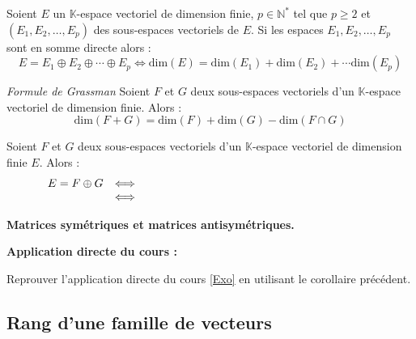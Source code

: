 \documentclass[french,11pt,twoside]{VcCours}
\newenvironment{ApplicationDirecte}{\textbf{Application directe du cours :}

}{}
\begin{document}
\begin{Corollaire}{} Soient $E$ un $\mathbb{K}$-espace vectoriel de dimension finie, $p \in \mathbb{N}^*$ tel que $p \geq 2$ et $(E_1, E_2, \ldots, E_p)$ des sous-espaces vectoriels de $E$. Si les espaces $E_1, E_2, \ldots, E_p$ sont en somme directe alors :
$$ E = E_1 \oplus E_2 \oplus \cdots \oplus E_p \Longleftrightarrow  \textrm{dim}(E) = \textrm{dim}(E_1) + \textrm{dim}(E_2) + \cdots \textrm{dim}(E_p)$$
\end{Corollaire}


\begin{Proposition}{\emph{Formule de Grassman}} Soient $F$ et $G$ deux sous-espaces vectoriels d'un $\mathbb{K}$-espace vectoriel de dimension finie. Alors :
$$ \textrm{dim}(F+G) = \textrm{dim}(F) + \textrm{dim}(G) - \textrm{dim}( F \cap G)$$
\end{Proposition}

\begin{Corollaire}{} Soient $F$ et $G$ deux sous-espaces vectoriels d'un $\mathbb{K}$-espace vectoriel de dimension finie $E$. Alors :
$$ \begin{array}{ccl}
E = F \oplus G & \Longleftrightarrow & \phantom{ F \cap G = \lbrace 0_E \rbrace \hbox{ et } \textrm{dim}(E) = \textrm{dim}(F) + \textrm{dim}(G)} \\
& \Longleftrightarrow & \phantom{ F + G = E  \hbox{ et } \textrm{dim}(E) = \textrm{dim}(F) + \textrm{dim}(G)} \\
\end{array}$$
\end{Corollaire}

\begin{Exemple} \textbf{Matrices symétriques et matrices antisymétriques.}
\end{Exemple}

\vspace{14cm}
\begin{ApplicationDirecte} Reprouver l'application directe du cours \ref{Exo} en utilisant le corollaire précédent.
\end{ApplicationDirecte}

\subsection{Rang d'une famille de vecteurs}
\end{document}
